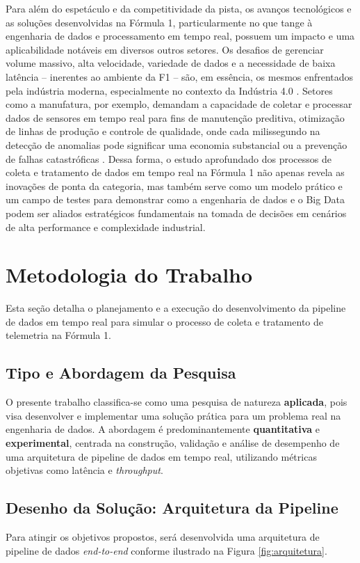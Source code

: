 \documentclass[12pt, %
openright, 
oneside, %
a4paper,    %
brazil]{facom-ufu-abntex2}
\begin{document}
Para além do espetáculo e da competitividade da pista, os avanços tecnológicos e as 
soluções desenvolvidas na Fórmula 1, particularmente no que tange à engenharia de dados 
e processamento em tempo real, possuem um impacto e uma aplicabilidade notáveis em 
diversos outros setores. Os desafios de gerenciar volume massivo, alta velocidade, 
variedade de dados e a necessidade de baixa latência – inerentes ao ambiente da F1 – 
são, em essência, os mesmos enfrentados pela indústria moderna, especialmente no 
contexto da Indústria 4.0 \cite{Singh2021BigData}. Setores como a manufatura, 
por exemplo, demandam a capacidade de coletar e processar dados de sensores em tempo 
real para fins de manutenção preditiva, otimização de linhas de produção e controle de 
qualidade, onde cada milissegundo na detecção de anomalias pode significar uma economia 
substancial ou a prevenção de falhas catastróficas \cite{Wijesinghe2024Predictive}. 
Dessa forma, o estudo aprofundado dos processos de coleta e tratamento de dados em tempo 
real na Fórmula 1 não apenas revela as inovações de ponta da categoria, mas também serve 
como um modelo prático e um campo de testes para demonstrar como a engenharia de dados 
e o Big Data podem ser aliados estratégicos fundamentais na tomada de decisões em 
cenários de alta performance e complexidade industrial.

\section{Metodologia do Trabalho}

Esta seção detalha o planejamento e a execução do desenvolvimento da pipeline de dados em tempo real para simular o processo de coleta e tratamento de telemetria na Fórmula 1.

\subsection{Tipo e Abordagem da Pesquisa}
O presente trabalho classifica-se como uma pesquisa de natureza \textbf{aplicada}, pois visa desenvolver e implementar uma solução prática para um problema real na engenharia de dados. A abordagem é predominantemente \textbf{quantitativa} e \textbf{experimental}, centrada na construção, validação e análise de desempenho de uma arquitetura de pipeline de dados em tempo real, utilizando métricas objetivas como latência e \textit{throughput}.

\subsection{Desenho da Solução: Arquitetura da Pipeline}
Para atingir os objetivos propostos, será desenvolvida uma arquitetura de pipeline de dados \textit{end-to-end} conforme ilustrado na Figura \ref{fig:arquitetura}.
\end{document}
